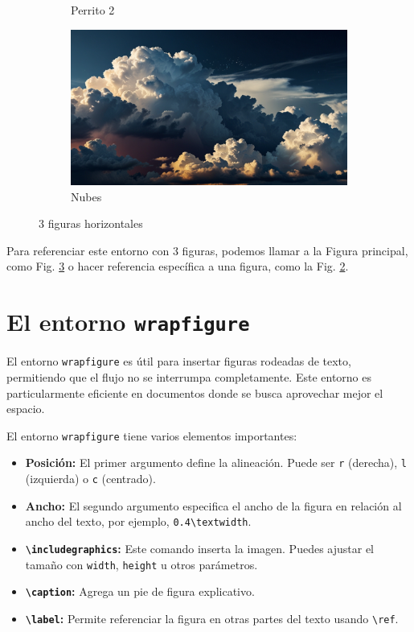 \documentclass[12pt]{article}
\begin{document}
\begin{figure}
\begin{subfigure}[b]{0.3\textwidth}
         \caption{Perrito 2}
         \label{fig:b}
     \end{subfigure}
     \hfill
     \begin{subfigure}[b]{0.3\textwidth}
         \centering
         \includegraphics[width=\textwidth]{Leonardo.jpg}
         \caption{Nubes}
         \label{fig:c}
     \end{subfigure}
        \caption{3 figuras horizontales}
        \label{fig:three graphs}
\end{figure}

Para referenciar este entorno con 3 figuras, podemos llamar a la Figura principal, como Fig. \ref{fig:three graphs} o hacer referencia espec\'ifica a una figura, como la Fig. \ref{fig:c}.

\section{El entorno \texttt{wrapfigure}}

El entorno \texttt{wrapfigure} es útil para insertar figuras rodeadas de texto, permitiendo que el flujo no se interrumpa completamente. Este entorno es particularmente eficiente en documentos donde se busca aprovechar mejor el espacio.

El entorno \texttt{wrapfigure} tiene varios elementos importantes:
\begin{itemize}
    \item \textbf{Posición:} El primer argumento define la alineación. Puede ser \texttt{r} (derecha), \texttt{l} (izquierda) o \texttt{c} (centrado).
    \item \textbf{Ancho:} El segundo argumento especifica el ancho de la figura en relación al ancho del texto, por ejemplo, \texttt{0.4\textbackslash textwidth}.
    \item \textbf{\texttt{\textbackslash includegraphics}:} Este comando inserta la imagen. Puedes ajustar el tamaño con \texttt{width}, \texttt{height} u otros parámetros.
    \item \textbf{\texttt{\textbackslash caption}:} Agrega un pie de figura explicativo.
    \item \textbf{\texttt{\textbackslash label}:} Permite referenciar la figura en otras partes del texto usando \texttt{\textbackslash ref}.
\end{itemize}
\end{document}
